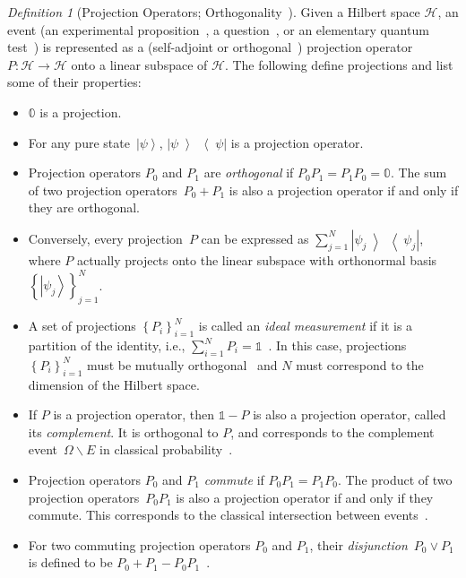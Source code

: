 \documentclass{article}
\theoremstyle{remark}
\newtheorem{definition}{Definition}
\newcommand{\Hilb}{\mathcal{H}}
\newcommand{\ket}[1]{{\left\vert{#1}\right\rangle}}
\newcommand{\op}[2]{\ensuremath{\left\vert{#1}\middle\rangle\middle\langle{#2}\right\vert}}
\newcommand{\proj}[1]{\op{#1}{#1}}
\begin{document}
\begin{definition}[Projection Operators; Orthogonality~\cite{10.2307/2308516,Redhead1987-REDINA,peres1995quantum,Griffiths2003,Swart2013}]
  \label{def:Projection} Given a Hilbert space $\Hilb$, an event (an
  experimental proposition~\cite{BirkhoffVonNeumann1936}, a
  question~\cite{10.2307/2308516,DBLP:journals/corr/abs-0910-2393}, or
  an elementary quantum test~\cite{peres1995quantum}) is represented
  as a (self-adjoint or orthogonal~\cite {Griffiths2003,Maassen2010})
  projection operator $P:\Hilb\rightarrow\Hilb$ onto a linear subspace
  of $\Hilb$. The following define projections and list some of their properties:
\begin{itemize}
\item $\mathbb{0}$ is a projection. 
\item For any pure state~$\ket{\psi}$, $\proj{\psi}$ is a projection
operator. 
\item Projection operators $P_{0}$ and $P_{1}$ are \emph{orthogonal}
  if $P_{0}P_{1}=P_{1}P_{0}=\mathbb{0}$. The sum of two projection
  operators~$P_{0}+P_{1}$ is also a projection operator if and only if
  they are orthogonal.
\item Conversely, every projection~$P$ can be expressed as
  $\sum_{j=1}^{N}\proj{\psi_{j}}$, where $P$ actually projects onto
  the linear subspace with orthonormal
  basis~$\left\{ \ket{\psi_{j}}\right\} _{j=1}^{N}$.
\item A set of projections $\left\{ P_{i}\right\} _{i=1}^{N}$ is
  called an \emph{ideal measurement} if it is a partition of the
  identity, i.e., $\sum_{i=1}^{N}P_{i}=\mathbb{1}$~\cite{Swart2013}.
  In this case, projections $\left\{ P_{i}\right\} _{i=1}^{N}$ must
  be mutually orthogonal~\cite{Griffiths2003} and $N$ must correspond
  to the dimension of the Hilbert space.
\item If $P$ is a projection operator, then $\mathbb{1}-P$ is also a
  projection operator, called its \emph{complement}. It is orthogonal to
  $P$, and corresponds to the complement event~$\Omega\backslash E$ in
  classical probability~\cite{Griffiths2003}.
\item Projection operators $P_{0}$ and $P_{1}$ \emph{commute} if $P_{0}P_{1}=P_{1}P_{0}$.
The product of two projection operators~$P_{0}P_{1}$ is also a projection
operator if and only if they commute. This corresponds to the classical
intersection between events~\cite{peres1995quantum,Griffiths2003}. 
\item For two commuting projection operators $P_{0}$ and $P_{1}$,
  their \emph{disjunction}~$P_{0}\vee P_{1}$ is defined to be
  $P_{0}+P_{1}-P_{0}P_{1}$~\cite{Griffiths2003}.
\end{itemize}
\end{definition}
\end{document}
